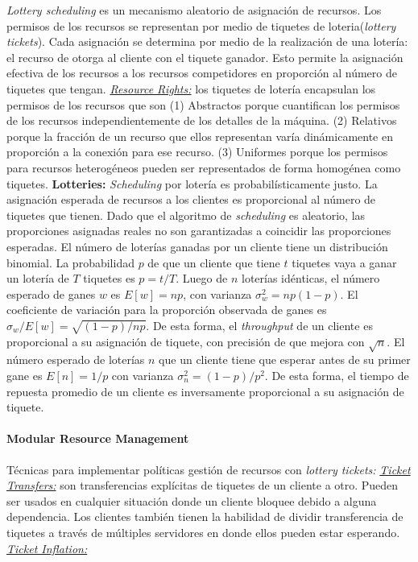 \textit{Lottery scheduling} es un mecanismo aleatorio de asignación de recursos. Los permisos de los recursos se representan por medio de tiquetes de loteria(\textit{lottery tickets}). Cada asignación se determina por medio de la realización de una lotería: el recurso de otorga al cliente con el tiquete ganador. Esto permite la asignación efectiva de los recursos a los recursos competidores en proporción al número de tiquetes que tengan. \underline{\textit{Resource Rights:}} los tiquetes de lotería encapsulan los permisos de los recursos que son (1) Abstractos porque cuantifican los permisos de los recursos independientemente de los detalles de la máquina. (2) Relativos porque la fracción de un recurso que ellos representan varía dinámicamente en proporción a la conexión para ese recurso. (3) Uniformes porque los permisos para recursos heterogéneos pueden ser representados de forma homogénea como tiquetes. \textbf{Lotteries:} \textit{Scheduling} por lotería es probabilísticamente justo. La asignación esperada de recursos a los clientes es proporcional al número de tiquetes que tienen. Dado que el algoritmo de \textit{scheduling} es aleatorio, las proporciones asignadas reales no son garantizadas a coincidir las proporciones esperadas. El número de loterías ganadas por un cliente tiene un distribución binomial. La probabilidad $p$ de que un cliente que tiene $t$ tiquetes vaya a ganar un lotería de $T$ tiquetes es $p = t/T$. Luego de $n$ loterías idénticas, el número esperado de ganes $w$ es $E[w] = np$, con varianza $\sigma^2_{w} = np(1-p)$. El coeficiente de variación para la proporción observada de ganes es $\sigma_w/E[w] = \sqrt{(1-p)/np}$. De esta forma, el \textit{throughput} de un cliente es proporcional a su asignación de tiquete, con precisión de que mejora con $\sqrt{n}$. El número esperado de loterías $n$ que un cliente tiene que esperar antes de su primer gane es $E[n] = 1/p$ con varianza $\sigma^2_{n} = (1-p)/p^2$. De esta forma, el tiempo de repuesta promedio de un cliente es inversamente proporcional a su asignación de tiquete.

\paragraph{\textnormal{\textbf{Modular Resource Management}}}
Técnicas para implementar políticas gestión de recursos con \textit{lottery tickets:} \underline{\textit{Ticket Transfers:}} son transferencias explícitas de tiquetes de un cliente a otro. Pueden ser usados en cualquier situación donde un cliente bloquee debido a alguna dependencia. Los clientes también tienen la habilidad de dividir transferencia de tiquetes a través de múltiples servidores en donde ellos pueden estar esperando. \underline{\textit{Ticket Inflation:}}

